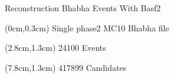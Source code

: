 \documentclass[8pt]{beamer}
\begin{document}
\begin{frame}{Reconstruction Bhabha Events With Basf2}
\begin{textblock*}{11cm}
\begin{figure}[h!]
\end{figure}


\end{textblock*}

\begin{textblock*}{11cm}(0cm,0.3cm)
	\centering
	Single phase2 MC10 Bhabha file
\end{textblock*}

\begin{textblock*}{4cm}(2.8cm,1.3cm)
	24100 Events
\end{textblock*}

\begin{textblock*}{4cm}(7.8cm,1.3cm)
	417899 Candidates
\end{textblock*}



\end{frame}
\end{document}
